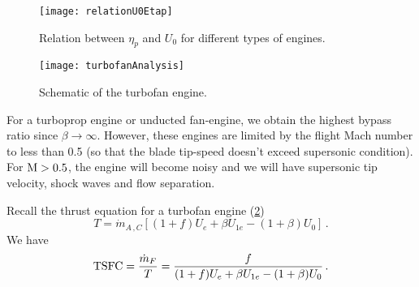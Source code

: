 \begin{figure}[!htb!]
 \centering
    {\texttt{[image: relationU0Etap]}}
    \caption{\label{FIG_RELATION_U0ETAP}Relation between $\eta_p$ and $U_0$ for different types of engines.}
\end{figure}

\begin{figure}[!htb!]
 \centering
    {\texttt{[image: turbofanAnalysis]}}
    \caption{\label{FIG_TURBOFAN_ANALYSIS}Schematic of the turbofan engine.}
\end{figure}

For a turboprop engine or unducted fan-engine, we obtain the highest bypass ratio since $\beta\to\infty$. However, these engines are limited by the flight Mach number to less than 0.5 (so that the blade tip-speed doesn't exceed supersonic condition). For ${\rm{M}} > 0.5$, the engine will become noisy and we will have supersonic tip velocity, shock waves and flow separation. 

Recall the thrust equation for a turbofan engine (\cref{FIG_TURBOFAN_ANALYSIS})
\begin{equation}
   T = \dot{m}_{A\,,C} \left[ (1+f) U_e + \beta U_{1e} - (1+\beta) U_0 \right] \, \text{.}
\end{equation}
We have
\begin{equation}
  \text{TSFC} = {\frac{\dot{m}_F}{T}} = {\frac{f}{(1+f)U_e+\beta U_{1e} - (1+\beta)U_0}}\,.
\end{equation}

